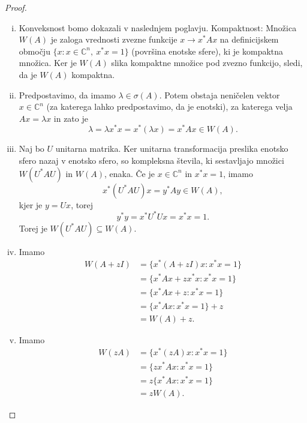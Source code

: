 \documentclass[12pt,a4paper]{amsart}
\theoremstyle{definition}
\theoremstyle{plain}
\newcommand{\C}{\mathbb C}
\begin{document}
\begin{proof}
\begin{enumerate}[(i)]
\item Konveksnost bomo dokazali v naslednjem poglavju. Kompaktnost: Množica $W(A)$ je zaloga vrednosti zvezne funkcije $x \rightarrow x^\ast Ax$ na definicijskem območju $\{x\! :x\in \C^n ,\ x^\ast x=1\}$ (površina enotske sfere), ki je kompaktna množica. Ker je $W(A)$ slika kompaktne množice pod zvezno funkcijo, sledi, da je $W(A)$ kompaktna.
\item Predpostavimo, da imamo $\lambda \in \sigma(A)$. Potem obstaja neničelen vektor $x\in \C ^n$ (za katerega lahko predpostavimo, da je enotski), za katerega velja $Ax=\lambda x$ in zato je
$$\lambda = \lambda x^\ast x=x^\ast (\lambda x) = x^\ast Ax \in W(A).$$
\item Naj bo $U$ unitarna matrika. Ker unitarna transformacija preslika enotsko sfero nazaj v enotsko sfero, so kompleksna števila, ki sestavljajo množici $W(U^\ast AU)$ in $W(A)$, enaka. 
Če je $x\in \C^n$ in $x^\ast x=1$, imamo $$x^\ast (U^\ast AU)x=y^\ast Ay \in W(A),$$ kjer je $y = Ux$, torej $$y^\ast y=x^\ast U^\ast Ux=x^\ast x=1.$$ Torej je $W(U^\ast AU)\subseteq W(A)$. 

\item Imamo 
\begin{align*}
W(A +zI)&=\{x^\ast (A+zI)x\! : x^\ast x=1\}\\
& = \{x^\ast Ax + zx^\ast x\! : x^\ast x =1\}\\
 &= \{x^\ast Ax + z\! : x^\ast x=1\} \\
&= \{x^\ast Ax\! : x^\ast x=1\} +z \\
&= W(A) +z.
\end{align*}
\item Imamo 
\begin{align*}
W(zA) &= \{x^\ast (zA)x\! : x^\ast x=1\}\\
& = \{zx^\ast Ax\! :x^\ast x =1\}\\
&= z\{x^\ast Ax\! :x^\ast x=1\}\\
& = zW(A).
\end{align*}


\end{enumerate}
\end{proof}
\end{document}
